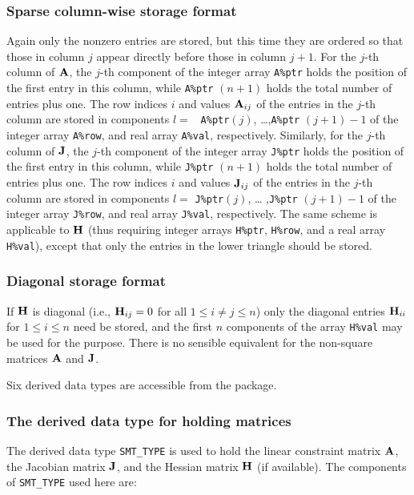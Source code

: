 \documentclass{galahad}
\begin{document}
\subsubsection{Sparse column-wise storage format}\label{columnwise}
Again only the nonzero entries are stored, but this time they are
ordered so that those in column $j$ appear directly before those in
column $j+1$. For the $j$-th column of ${\mathbf{A}}$, the $j$-th component of
the integer array {\tt A\%ptr} holds the position of the first entry in
this column, while {\tt A\%ptr} $(n+1)$ holds the total number of
entries plus one.  The row indices $i$ and values ${\mathbf{A}}_{ij}$ of the
entries in the $j$-th column are stored in components $l =$ {\tt
  A\%ptr}$(j)$, \ldots ,{\tt A\%ptr} $(j+1)-1$ of the integer array
{\tt A\%row}, and real array {\tt A\%val}, respectively.  Similarly,
for the $j$-th column of ${\mathbf{J}}$, the $j$-th component of the integer array
{\tt J\%ptr} holds the position of the first entry in this column,
while {\tt J\%ptr} $(n+1)$ holds the total number of entries plus one.
The row indices $i$ and values ${\mathbf{J}}_{ij}$ of the entries in the
$j$-th column are stored in components $l =$ {\tt J\%ptr}$(j)$, \ldots
,{\tt J\%ptr} $(j+1)-1$ of the integer array {\tt J\%row}, and real
array {\tt J\%val}, respectively.  The same scheme is applicable to
${\mathbf{H}}$ (thus requiring integer arrays {\tt H\%ptr}, {\tt H\%row}, and
a real array {\tt H\%val}), except that only the entries in the lower
triangle should be stored.

\subsubsection{Diagonal storage format}\label{diagonal}
If ${\mathbf{H}}$ is diagonal (i.e., ${\mathbf{H}}_{ij} = 0$ for all $1 \leq i \neq j \leq n$)
only the diagonal entries ${\mathbf{H}}_{ii}$ for $1 \leq i \leq n$ need be stored,
and the first $n$ components of the array {\tt H\%val} may be used for 
the purpose. There is no sensible equivalent for the non-square
matrices ${\mathbf{A}}$ and ${\mathbf{J}}$.





\galtypes
Six derived data types are accessible from the package.


\subsubsection{The derived data type for holding matrices}\label{typesmt}
The derived data type {\tt SMT\_TYPE} is used to hold the linear
constraint matrix ${\mathbf{A}}$, the Jacobian matrix ${\mathbf{J}}$, and the Hessian
matrix ${\mathbf{H}}$ (if available). The components of {\tt SMT\_TYPE}
used here are:
\end{document}

